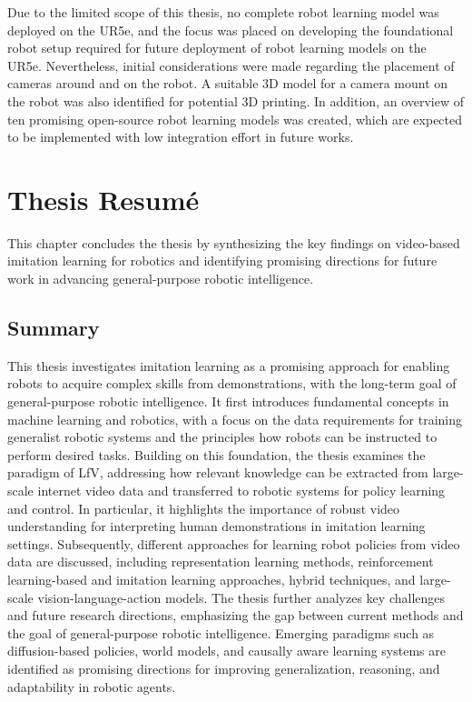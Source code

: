 Due to the limited scope of this thesis, no complete robot learning model was deployed on the UR5e, and the focus was placed on developing the foundational robot setup required for future deployment of robot learning models on the UR5e.
Nevertheless, initial considerations were made regarding the placement of cameras around and on the robot. A suitable 3D model for a camera mount on the robot was also identified for potential 3D printing.
In addition, an overview of ten promising open-source robot learning models was created, which are expected to be implemented with low integration effort in future works.






\chapter{Thesis Resumé}
\minitoc
This chapter concludes the thesis by synthesizing the key findings on video-based imitation learning for robotics and identifying promising directions for future work in advancing general-purpose robotic intelligence.

\section{Summary}

This thesis investigates imitation learning as a promising approach for enabling robots to acquire complex skills from demonstrations, with the long-term goal of general-purpose robotic intelligence.
It first introduces fundamental concepts in machine learning and robotics, with a focus on the data requirements for training generalist robotic systems and the principles how robots can be instructed to perform desired tasks. Building on this foundation, the thesis examines the paradigm of \ac{LfV}, addressing how relevant knowledge can be extracted from large-scale internet video data and transferred to robotic systems for policy learning and control. In particular, it highlights the importance of robust video understanding for interpreting human demonstrations in imitation learning settings.
Subsequently, different approaches for learning robot policies from video data are discussed, including representation learning methods, reinforcement learning-based and imitation learning approaches, hybrid techniques, and large-scale vision-language-action models. The thesis further analyzes key challenges and future research directions, emphasizing the gap between current methods and the goal of general-purpose robotic intelligence. Emerging paradigms such as diffusion-based policies, world models, and causally aware learning systems are identified as promising directions for improving generalization, reasoning, and adaptability in robotic agents.

